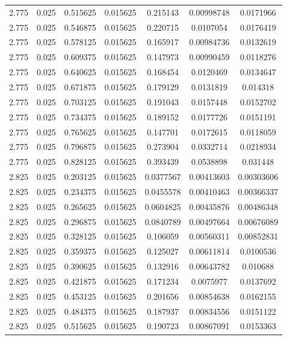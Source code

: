 \begin{table}[bh]
\begin{center}
{\begin{tabular}{ccccccc}
2.775	 & 0.025 & 	0.515625	 & 0.015625	 & 0.215143	 & 0.00998748	 & 0.0171966 \\ 
2.775	 & 0.025 & 	0.546875	 & 0.015625	 & 0.220715	 & 0.0107054	 & 0.0176419 \\ 
2.775	 & 0.025 & 	0.578125	 & 0.015625	 & 0.165917	 & 0.00984736	 & 0.0132619 \\ 
2.775	 & 0.025 & 	0.609375	 & 0.015625	 & 0.147973	 & 0.00990459	 & 0.0118276 \\ 
2.775	 & 0.025 & 	0.640625	 & 0.015625	 & 0.168454	 & 0.0120469	 & 0.0134647 \\ 
2.775	 & 0.025 & 	0.671875	 & 0.015625	 & 0.179129	 & 0.0131819	 & 0.014318 \\ 
2.775	 & 0.025 & 	0.703125	 & 0.015625	 & 0.191043	 & 0.0157448	 & 0.0152702 \\ 
2.775	 & 0.025 & 	0.734375	 & 0.015625	 & 0.189152	 & 0.0177726	 & 0.0151191 \\ 
2.775	 & 0.025 & 	0.765625	 & 0.015625	 & 0.147701	 & 0.0172615	 & 0.0118059 \\ 
2.775	 & 0.025 & 	0.796875	 & 0.015625	 & 0.273904	 & 0.0332714	 & 0.0218934 \\ 
2.775	 & 0.025 & 	0.828125	 & 0.015625	 & 0.393439	 & 0.0538898	 & 0.031448 \\ 
2.825	 & 0.025 & 	0.203125	 & 0.015625	 & 0.0377567	 & 0.00413603	 & 0.00303606 \\ 
2.825	 & 0.025 & 	0.234375	 & 0.015625	 & 0.0455578	 & 0.00410463	 & 0.00366337 \\ 
2.825	 & 0.025 & 	0.265625	 & 0.015625	 & 0.0604825	 & 0.00435876	 & 0.00486348 \\ 
2.825	 & 0.025 & 	0.296875	 & 0.015625	 & 0.0840789	 & 0.00497664	 & 0.00676089 \\ 
2.825	 & 0.025 & 	0.328125	 & 0.015625	 & 0.106059	 & 0.00560311	 & 0.00852831 \\ 
2.825	 & 0.025 & 	0.359375	 & 0.015625	 & 0.125027	 & 0.00611814	 & 0.0100536 \\ 
2.825	 & 0.025 & 	0.390625	 & 0.015625	 & 0.132916	 & 0.00643782	 & 0.010688 \\ 
2.825	 & 0.025 & 	0.421875	 & 0.015625	 & 0.171234	 & 0.0075977	 & 0.0137692 \\ 
2.825	 & 0.025 & 	0.453125	 & 0.015625	 & 0.201656	 & 0.00854638	 & 0.0162155 \\ 
2.825	 & 0.025 & 	0.484375	 & 0.015625	 & 0.187937	 & 0.00834556	 & 0.0151122 \\ 
2.825	 & 0.025 & 	0.515625	 & 0.015625	 & 0.190723	 & 0.00867091	 & 0.0153363 \\ 

\end{tabular}}
\end{center}
\end{table}
